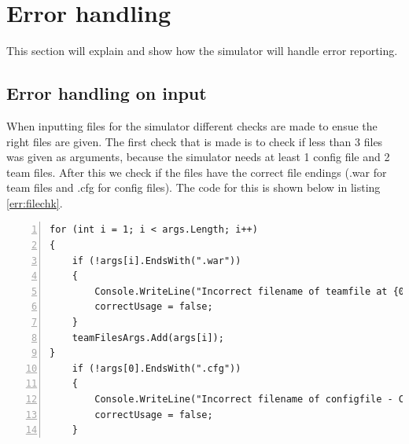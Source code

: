 \section{Error handling}
	This section will explain and show how the simulator will handle error reporting.
	\subsection{Error handling on input}
		When inputting files for the simulator different checks are made to ensue the right files are given. The first check that is made 
		is to check if less than 3 files was given as arguments, because the simulator needs at least 1 config file and 2 team files.
		After this we check if the files have the correct file endings (.war for team files and .cfg for config files). The code for this is 
		shown below in listing \ref{err:filechk}.
		\begin{lstlisting}[basicstyle=\small\sffamily,
			keywords={break,case,const,continue,default,else,enum,
			for,if,return,switch,while,do,long,void,int,float,double,
			char,struct,typedef,include,size\_t},
			keywordstyle={\color{blue}},
			comment={[l]{//}}, morecomment={[s]{/*}{*/}}, commentstyle=\itshape,
			columns={[l]flexible}, numbers=left, numberstyle=\tiny,
			frameround=fftt, frame=shadowbox, captionpos=b,
			caption={Checking of file endings},
			label=err:filechk]
for (int i = 1; i < args.Length; i++)
{
	if (!args[i].EndsWith(".war"))
    {
    	Console.WriteLine("Incorrect filename of teamfile at {0} - Correct usage: .war", (i+1));
        correctUsage = false;
    }
    teamFilesArgs.Add(args[i]);
}
    if (!args[0].EndsWith(".cfg"))
    {
    	Console.WriteLine("Incorrect filename of configfile - Correct usage: .cfg");
        correctUsage = false;
    }
		\end{lstlisting}
		
